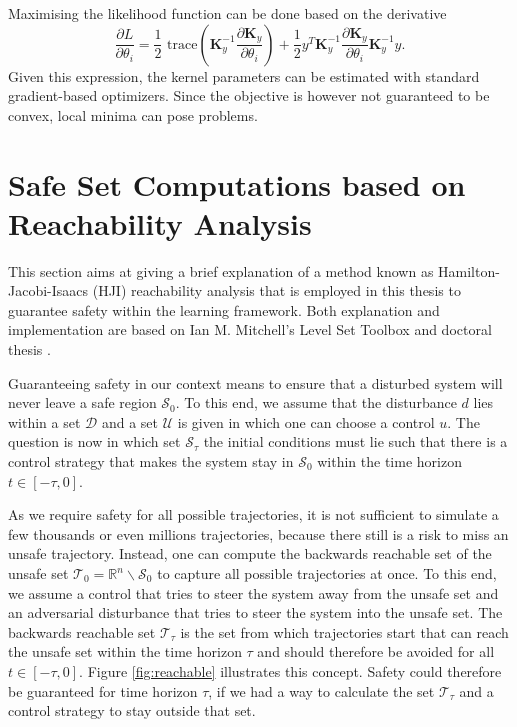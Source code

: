 \documentclass[../main.tex]{subfiles}
\begin{document}
Maximising the likelihood function can be done based on the derivative
\begin{equation}
    \frac{\partial L}{\partial \theta_i} = \dfrac{1}{2} \text{ trace} \left( \mathbf{K}_y^{-1} \frac{\partial \mathbf{K}_y}{\partial \theta_i} \right) + \frac{1}{2}y^T\mathbf{K}_y^{-1} \frac{\partial \mathbf{K}_y}{\partial \theta_i} \mathbf{K}_y^{-1} y.
\end{equation}
Given this expression, the kernel parameters can be estimated with standard gradient-based optimizers. Since the objective is however not guaranteed to be convex, local minima can pose problems.


\section{Safe Set Computations based on Reachability Analysis}\label{sec:SafeSets}
This section aims at giving a brief explanation of a method known as Hamilton-Jacobi-Isaacs (HJI) reachability analysis that is employed in this thesis to guarantee safety within the learning framework. Both explanation and implementation are based on Ian M. Mitchell's Level Set Toolbox \cite{mitchell2004toolbox} and doctoral thesis \cite{mitchell2003application}.

Guaranteeing safety in our context means to ensure that a disturbed system will never leave a safe region $\mathcal{S}_0$. To this end, we assume that the disturbance $d$ lies within a set $\mathcal{D}$ and a set $\mathcal{U}$ is given in which one can choose a control $u$. The question is now in which set $\mathcal{S}_\tau$ the initial conditions must lie such that there is a control strategy that makes the system stay in $\mathcal{S}_0$ within the time horizon $t \in [-\tau,0]$. 

As we require safety for all possible trajectories, it is not sufficient to simulate a few thousands or even millions trajectories, because there still is a risk to miss an unsafe trajectory. Instead, one can compute the backwards reachable set of the unsafe set $\mathcal{T}_0 = \mathbb{R}^n\backslash \mathcal{S}_0$ to capture all possible trajectories at once. To this end, we assume a control that tries to steer the system away from the unsafe set and an adversarial disturbance that tries to steer the system into the unsafe set. The backwards reachable set $\mathcal{T}_\tau$ is the set from which trajectories start that can reach the unsafe set within the time horizon $\tau$ and should therefore be avoided for all $t \in [-\tau,0]$. Figure \ref{fig:reachable} illustrates this concept. Safety could therefore be guaranteed for time horizon $\tau$, if we had a way to calculate the set $\mathcal{T}_\tau$ and a control strategy to stay outside that set. 
\end{document}
